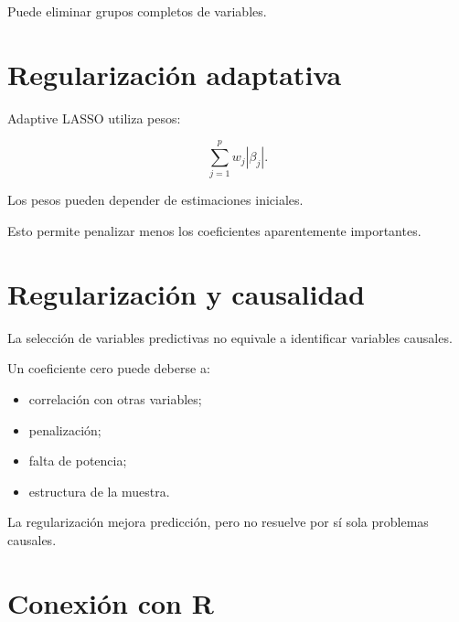 \documentclass[
  spanish,
  11pt,
  letterpaper,
  DIV=11,
  numbers=noendperiod]{scrreprt}
\providecommand{\tightlist}{%
  \setlength{\itemsep}{0pt}\setlength{\parskip}{0pt}}
\theoremstyle{definition}
\theoremstyle{plain}
\theoremstyle{definition}
\theoremstyle{remark}
\begin{document}
Puede eliminar grupos completos de variables.

\section{Regularización adaptativa}\label{regularizaciuxf3n-adaptativa}

Adaptive LASSO utiliza pesos:

\[
\sum_{j=1}^{p}
w_j|\beta_j|.
\]

Los pesos pueden depender de estimaciones iniciales.

Esto permite penalizar menos los coeficientes aparentemente importantes.

\section{Regularización y
causalidad}\label{regularizaciuxf3n-y-causalidad}

La selección de variables predictivas no equivale a identificar
variables causales.

Un coeficiente cero puede deberse a:

\begin{itemize}
\tightlist
\item
  correlación con otras variables;
\item
  penalización;
\item
  falta de potencia;
\item
  estructura de la muestra.
\end{itemize}

La regularización mejora predicción, pero no resuelve por sí sola
problemas causales.

\section{Conexión con R}\label{conexiuxf3n-con-r-7}
\end{document}
